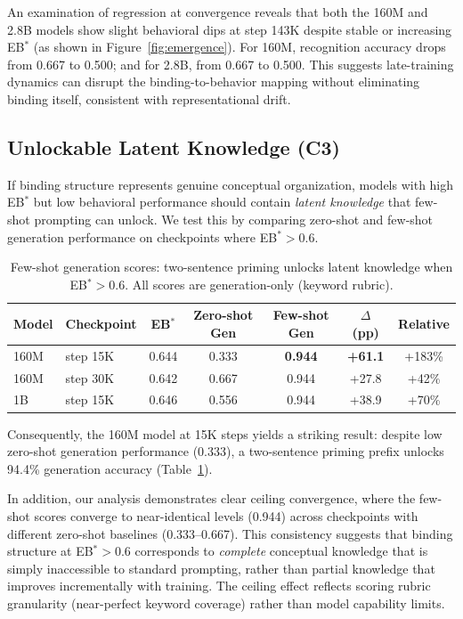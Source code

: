 \documentclass[10pt]{article} %
\begin{document}
An examination of regression at convergence reveals that both the 160M and 2.8B models show slight behavioral dips at step 143K despite stable or increasing EB$^*$ (as shown in Figure~\ref{fig:emergence}).
For 160M, recognition accuracy drops from 0.667 to 0.500; and for 2.8B, from 0.667 to 0.500.
This suggests late-training dynamics can disrupt the binding-to-behavior mapping without eliminating binding itself, consistent with representational drift.

\subsection{Unlockable Latent Knowledge (C3)}\label{sec:c3}

If binding structure represents genuine conceptual organization, models with high EB$^*$ but low behavioral performance should contain \emph{latent knowledge} that few-shot prompting can unlock.
We test this by comparing zero-shot and few-shot generation performance on checkpoints where EB$^*>0.6$.

\begin{table}[h]
\centering
\begin{tabular}{|l|l|c|c|c|c|c|}
\hline
\textbf{Model} & \textbf{Checkpoint} & \textbf{EB$^*$} & \textbf{Zero-shot Gen} & \textbf{Few-shot Gen} & \textbf{$\Delta$ (pp)} & \textbf{Relative} \\
\hline
160M & step 15K & 0.644 & 0.333 & \textbf{0.944} & \textbf{+61.1} & +183\% \\
160M & step 30K & 0.642 & 0.667 & 0.944 & +27.8 & +42\% \\
1B & step 15K & 0.646 & 0.556 & 0.944 & +38.9 & +70\% \\
\hline
\end{tabular}
\caption{Few-shot generation scores: two-sentence priming unlocks latent knowledge when EB$^*>0.6$. All scores are generation-only (keyword rubric).}
\label{tab:c3_pilot_unlock}
\end{table}

Consequently, the 160M model at 15K steps yields a striking result: despite low zero-shot generation performance (0.333), a two-sentence priming prefix unlocks 94.4\% generation accuracy (Table~\ref{tab:c3_pilot_unlock}).

In addition, our analysis demonstrates clear ceiling convergence, where the few-shot scores converge to near-identical levels (0.944) across checkpoints with different zero-shot baselines (0.333--0.667).
This consistency suggests that binding structure at EB$^*>0.6$ corresponds to \emph{complete} conceptual knowledge that is simply inaccessible to standard prompting, rather than partial knowledge that improves incrementally with training.
The ceiling effect reflects scoring rubric granularity (near-perfect keyword coverage) rather than model capability limits.
\end{document}
